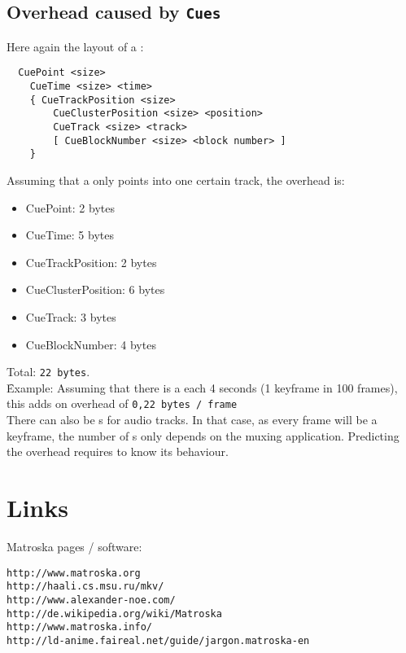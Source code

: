 \documentclass[12pt]{article}
\begin{document}
\subsection{Overhead caused by \texttt{Cues}}
Here again the layout of a :
\begin{verbatim}
  CuePoint <size>
    CueTime <size> <time>
    { CueTrackPosition <size>
        CueClusterPosition <size> <position>
        CueTrack <size> <track>
        [ CueBlockNumber <size> <block number> ] 
    }
\end{verbatim}
Assuming that a  only points into one certain track,
the overhead is:
\begin{itemize}
\item CuePoint: 2 bytes
\item   CueTime: 5 bytes
\item   CueTrackPosition: 2 bytes
\item     CueClusterPosition: 6 bytes
\item     CueTrack: 3 bytes
\item     CueBlockNumber: 4 bytes
\end{itemize}
Total: \texttt{22 bytes}.\\[0.3cm]
\f{Example:} Assuming that there is a  each 4 seconds (1 keyframe
in 100 frames), this adds on overhead of \texttt{0,22 bytes / frame}\\[0.2cm]
There can also be s for audio tracks. In that case, as every
frame will be a keyframe, the number of s only depends on the
muxing application. Predicting the overhead requires to know its behaviour.
\newpage
\section{Links}
Matroska pages / software: 
\begin{verbatim}
http://www.matroska.org
http://haali.cs.msu.ru/mkv/
http://www.alexander-noe.com/
http://de.wikipedia.org/wiki/Matroska
http://www.matroska.info/
http://ld-anime.faireal.net/guide/jargon.matroska-en
\end{verbatim}
\end{document}
